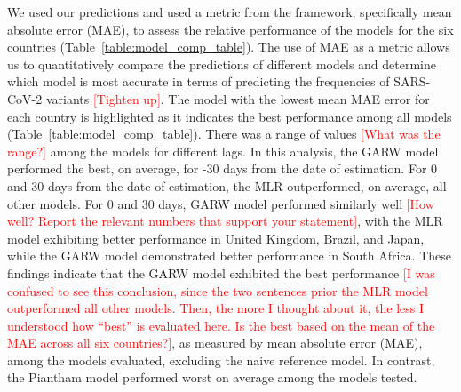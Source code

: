 \documentclass[11pt,oneside,letterpaper]{article}
\def\jhc#1{\textcolor{red}{[#1]}}
\begin{document}
We used our predictions and used a metric from the framework, specifically mean absolute error (MAE), to assess the relative performance of the models for the six countries (Table~\ref{table:model_comp_table}).
The use of MAE as a metric allows us to quantitatively compare the predictions of different models and determine which model is most accurate in terms of predicting the frequencies of SARS-CoV-2 variants \jhc{Tighten up}.
The model with the lowest mean MAE error for each country is highlighted as it indicates the best performance among all models (Table~\ref{table:model_comp_table}).
There was a range of values \jhc{What was the range?} among the models for different lags.
In this analysis, the GARW model performed the best, on average, for -30 days from the date of estimation.
For 0 and 30 days from the date of estimation, the MLR outperformed, on average, all other models.
For 0 and 30 days, GARW model performed similarly well \jhc{How well? Report the relevant numbers that support your statement}, with the MLR model exhibiting better performance in United Kingdom, Brazil, and Japan, while the GARW model demonstrated better performance in South Africa.
These findings indicate that the GARW model exhibited the best performance \jhc{I was confused to see this conclusion, since the two sentences prior the MLR model outperformed all other models. Then, the more I thought about it, the less I understood how ``best'' is evaluated here. Is the best based on the mean of the MAE across all six countries?}, as measured by mean absolute error (MAE), among the models evaluated, excluding the naive reference model.
In contrast, the Piantham model performed worst on average among the models tested.
\end{document}
